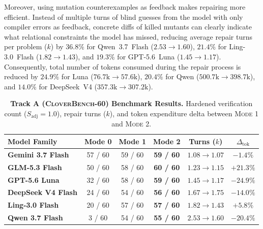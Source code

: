 \documentclass{article}
\begin{document}
Moreover, using mutation counterexamples as feedback makes repairing more efficient. Instead of multiple turns of blind guesses from the model with only compiler errors as feedback, concrete diffs of killed mutants can clearly indicate what relational constraints the model has missed, reducing average repair turns per problem ($k$) by $36.8\%$ for Qwen~3.7~Flash ($2.53 \to 1.60$), $21.4\%$ for Ling-3.0~Flash ($1.82 \to 1.43$), and $19.3\%$ for GPT-5.6~Luna ($1.45 \to 1.17$). Consequently, total number of tokens consumed during the repair process is reduced by $24.9\%$ for Luna ($76.7\text{k} \to 57.6\text{k}$), $20.4\%$ for Qwen ($500.7\text{k} \to 398.7\text{k}$), and $14.0\%$ for DeepSeek~V4 ($357.3\text{k} \to 307.2\text{k}$).

\begin{table}[!htbp]
\centering
\caption{\textbf{Track A (\textsc{CloverBench-60}) Benchmark Results.} Hardened verification count ($S_{\text{adj}}=1.0$), repair turns ($k$), and token expenditure delta between \textsc{Mode 1} and \textsc{Mode 2}.}
\label{tab:track_a}
\setlength{\tabcolsep}{8pt}
\begin{tabular}{lccccc}
\toprule
\textbf{Model Family} & \textbf{Mode 0} & \textbf{Mode 1} & \textbf{Mode 2} & \textbf{Turns ($k$)} & \textbf{$\Delta_{\text{tok}}$} \\
\midrule
\textbf{Gemini 3.7 Flash} & 57 / 60 & 59 / 60 & \textbf{59 / 60} & $1.08 \to 1.07$ & $-1.4\%$ \\
\textbf{GLM-5.3 Flash} & 50 / 60 & 58 / 60 & \textbf{60 / 60} & $1.23 \to 1.15$ & $+21.3\%$ \\
\textbf{GPT-5.6 Luna} & 32 / 60 & 58 / 60 & \textbf{59 / 60} & $1.45 \to 1.17$ & \textbf{$-24.9\%$} \\
\textbf{DeepSeek V4 Flash} & 24 / 60 & 54 / 60 & \textbf{56 / 60} & $1.67 \to 1.75$ & $-14.0\%$ \\
\textbf{Ling-3.0 Flash} & 20 / 60 & 57 / 60 & \textbf{57 / 60} & $1.82 \to 1.43$ & $+5.8\%$ \\
\textbf{Qwen 3.7 Flash} & 3 / 60 & 54 / 60 & \textbf{55 / 60} & $2.53 \to 1.60$ & \textbf{$-20.4\%$} \\
\bottomrule
\end{tabular}
\end{table}
\end{document}
